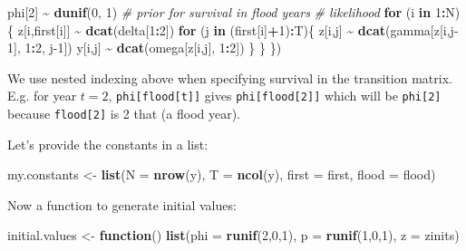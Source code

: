 \documentclass[
  12pt,
]{krantz}
\newenvironment{Shaded}{\begin{snugshade}}{\end{snugshade}}
\newcommand{\AttributeTok}[1]{\textcolor[rgb]{0.13,0.29,0.53}{#1}}
\newcommand{\CommentTok}[1]{\textcolor[rgb]{0.56,0.35,0.01}{\textit{#1}}}
\newcommand{\ControlFlowTok}[1]{\textcolor[rgb]{0.13,0.29,0.53}{\textbf{#1}}}
\newcommand{\DecValTok}[1]{\textcolor[rgb]{0.00,0.00,0.81}{#1}}
\newcommand{\FunctionTok}[1]{\textcolor[rgb]{0.13,0.29,0.53}{\textbf{#1}}}
\newcommand{\NormalTok}[1]{#1}
\newcommand{\OtherTok}[1]{\textcolor[rgb]{0.56,0.35,0.01}{#1}}
\newcommand{\SpecialCharTok}[1]{\textcolor[rgb]{0.81,0.36,0.00}{\textbf{#1}}}
\begin{document}
\begin{Shaded}
\begin{Highlighting}[]
\NormalTok{  phi[}\DecValTok{2}\NormalTok{] }\SpecialCharTok{\textasciitilde{}} \FunctionTok{dunif}\NormalTok{(}\DecValTok{0}\NormalTok{, }\DecValTok{1}\NormalTok{)   }\CommentTok{\# prior for survival in flood years}
  \CommentTok{\# likelihood}
  \ControlFlowTok{for}\NormalTok{ (i }\ControlFlowTok{in} \DecValTok{1}\SpecialCharTok{:}\NormalTok{N)\{}
\NormalTok{    z[i,first[i]] }\SpecialCharTok{\textasciitilde{}} \FunctionTok{dcat}\NormalTok{(delta[}\DecValTok{1}\SpecialCharTok{:}\DecValTok{2}\NormalTok{])}
    \ControlFlowTok{for}\NormalTok{ (j }\ControlFlowTok{in}\NormalTok{ (first[i]}\SpecialCharTok{+}\DecValTok{1}\NormalTok{)}\SpecialCharTok{:}\NormalTok{T)\{}
\NormalTok{      z[i,j] }\SpecialCharTok{\textasciitilde{}} \FunctionTok{dcat}\NormalTok{(gamma[z[i,j}\DecValTok{{-}1}\NormalTok{], }\DecValTok{1}\SpecialCharTok{:}\DecValTok{2}\NormalTok{, j}\DecValTok{{-}1}\NormalTok{])}
\NormalTok{      y[i,j] }\SpecialCharTok{\textasciitilde{}} \FunctionTok{dcat}\NormalTok{(omega[z[i,j], }\DecValTok{1}\SpecialCharTok{:}\DecValTok{2}\NormalTok{])}
\NormalTok{    \}}
\NormalTok{  \}}
\NormalTok{\})}
\end{Highlighting}
\end{Shaded}

We use nested indexing above when specifying survival in the transition matrix. E.g. for year \(t = 2\), \texttt{phi{[}flood{[}t{]}{]}} gives \texttt{phi{[}flood{[}2{]}{]}} which will be \texttt{phi{[}2{]}} because \texttt{flood{[}2{]}} is 2 that (a flood year).

Let's provide the constants in a list:

\begin{Shaded}
\begin{Highlighting}[]
\NormalTok{my.constants }\OtherTok{\textless{}{-}} \FunctionTok{list}\NormalTok{(}\AttributeTok{N =} \FunctionTok{nrow}\NormalTok{(y),}
                     \AttributeTok{T =} \FunctionTok{ncol}\NormalTok{(y),}
                     \AttributeTok{first =}\NormalTok{ first,}
                     \AttributeTok{flood =}\NormalTok{ flood)}
\end{Highlighting}
\end{Shaded}

Now a function to generate initial values:

\begin{Shaded}
\begin{Highlighting}[]
\NormalTok{initial.values }\OtherTok{\textless{}{-}} \ControlFlowTok{function}\NormalTok{() }\FunctionTok{list}\NormalTok{(}\AttributeTok{phi =} \FunctionTok{runif}\NormalTok{(}\DecValTok{2}\NormalTok{,}\DecValTok{0}\NormalTok{,}\DecValTok{1}\NormalTok{),}
                                  \AttributeTok{p =} \FunctionTok{runif}\NormalTok{(}\DecValTok{1}\NormalTok{,}\DecValTok{0}\NormalTok{,}\DecValTok{1}\NormalTok{),}
                                  \AttributeTok{z =}\NormalTok{ zinits)}
\end{Highlighting}
\end{Shaded}
\end{document}
